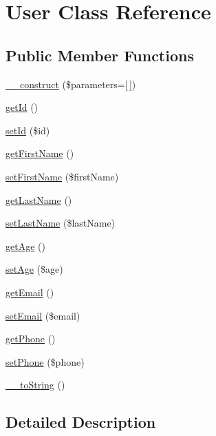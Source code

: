 \hypertarget{class_user}{}\section{User Class Reference}
\label{class_user}
\subsection*{Public Member Functions}
\begin{DoxyCompactItemize}
\item 
\hyperlink{class_user_a733e4e74c86a61ec95cd1f4b84a71383}{\+\_\+\+\_\+construct} (\$parameters=\mbox{[}$\,$\mbox{]})
\item 
\hyperlink{class_user_a12251d0c022e9e21c137a105ff683f13}{get\+Id} ()
\item 
\hyperlink{class_user_a87313ad678fb2a2a8efb435cf0bdb9a0}{set\+Id} (\$id)
\item 
\hyperlink{class_user_ace5f32fc99c7c5989f7576755fc60972}{get\+First\+Name} ()
\item 
\hyperlink{class_user_a83e84c312d983f847f8e48d6e457d081}{set\+First\+Name} (\$first\+Name)
\item 
\hyperlink{class_user_a717286a8348a6cf9f6d5fecb04a55fad}{get\+Last\+Name} ()
\item 
\hyperlink{class_user_a90ee65f53f523c6ec0abb74c014c3e2a}{set\+Last\+Name} (\$last\+Name)
\item 
\hyperlink{class_user_aa45b65846565bea3073f766710582a3f}{get\+Age} ()
\item 
\hyperlink{class_user_adc5038de9cf66737c3ec367ed6271176}{set\+Age} (\$age)
\item 
\hyperlink{class_user_a02a01849f28e2535e888ae4ec87b20f2}{get\+Email} ()
\item 
\hyperlink{class_user_a5ef76eef42d2624386442eeb636d338c}{set\+Email} (\$email)
\item 
\hyperlink{class_user_a5e8a94cd59635ac689687849b9f5cd9d}{get\+Phone} ()
\item 
\hyperlink{class_user_a8d1b74eee01080bc0040c74d1ff250e9}{set\+Phone} (\$phone)
\item 
\hyperlink{class_user_a7516ca30af0db3cdbf9a7739b48ce91d}{\+\_\+\+\_\+to\+String} ()
\end{DoxyCompactItemize}


\subsection{Detailed Description}


